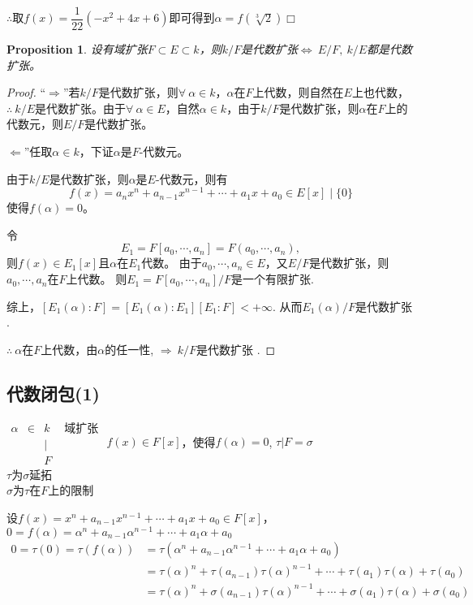 \documentclass[UTF8]{article}
\newtheorem{prop}{Proposition}[section]
\begin{document}
\quad $\therefore$取$f(x)=\dfrac{1}{22}\left(-x^{2}+4 x+6\right)$即可得到$\alpha=f\left(\sqrt[3]{2}\right)$\hfill$\Box$

\quad

\noindent
{}
\setlength{\hangindent}{3em}
\begin{prop}
设有域扩张$F\subset E\subset k$，则$k/F$是代数扩张$\Longleftrightarrow\ E/F,\ k/E$都是代数扩张。
\end{prop}
\begin{proof}
“$\Longrightarrow$”\quad 若$k/F$是代数扩张，则$\forall\ \alpha\in k$，$\alpha$在$F$上代数，则自然在$E$上也代数，$\therefore\ k/E$是代数扩张。由于$\forall\ \alpha\in E$，自然$\alpha\in k$，由于$k/F$是代数扩张，则$\alpha$在$F$上的代数元，则$E/F$是代数扩张。

$\Longleftarrow$”\quad 任取$\alpha\in k$，下证$\alpha$是$F$-代数元。

由于$k/E$是代数扩张，则$\alpha$是$E$-代数元，则有
$$
f(x)=a_{n} x^{n}+a_{n-1} x^{n-1}+\cdots+a_{1} x+a_{0}\in E[x] \mid \{ 0\}
$$
使得$f(\alpha)=0$。

令
$$E_1=F\left[ a_0,\cdots,a_n\right]=F\left( a_0,\cdots,a_n\right),$$
则$f(x)\in E_1[x]$且$\alpha$在$E_1$代数。 
由于$a_0,\cdots,a_n\in E$，又$E/F$是代数扩张，则$a_0,\cdots,a_n$在$F$上代数。 
则$E_1=F\left[ a_0,\cdots,a_n\right]/F$是一个有限扩张.

综上，$\left[ E_1\left( \alpha\right): F\right]=\left[ E_1\left( \alpha\right): E_1\right]\left[ E_1: F\right]<+\infty$.
从而$E_1\left( \alpha\right)/F$是代数扩张 .

$\therefore\ \alpha$在$F$上代数，由$\alpha$的任一性,
$\Rightarrow\ k/F$是代数扩张 .
\end{proof}
\subsection{代数闭包(1)}

$\begin{array}{cccc}
\alpha &\in &k &\text{ 域扩张 }\\ 
&&\mid &\\ 
&&F &
\end{array}$\qquad $f(x)\in F[x]$，使得$f(\alpha)=0$,
$\tau|F=\sigma$ \\ 
$\tau$为$\sigma$延拓\\ 
$\sigma$为$\tau$在$F$上的限制

设$f(x)=x^{n}+a_{n-1} x^{n-1}+\cdots+a_{1} x+a_{0}\in F[x]$，\ $0=f(\alpha)=\alpha^{n}+a_{n-1}\alpha^{n-1}+\cdots +a_{1}\alpha+a_{0}$
$$
\begin{aligned}
0=\tau\left( 0\right)=\tau\left( f\left( \alpha\right)\right)&=\tau\left( \alpha^{n}+a_{n-1}\alpha^{n-1}+\cdots+a_{1}\alpha+a_{0}\right)\\ 
&=\tau\left( \alpha\right)^n+\tau\left( a_{n-1}\right)\tau\left( \alpha\right)^{n-1}+\cdots+\tau\left( a_1\right)\tau\left( \alpha\right)+\tau\left( a_0\right)\\ 
&=\tau\left( \alpha\right)^n+\sigma\left( a_{n-1}\right)\tau\left( \alpha\right)^{n-1}+\cdots+\sigma\left( a_1\right)\tau\left( \alpha\right)+\sigma\left( a_0\right)
\end{aligned}
$$
\end{document}
